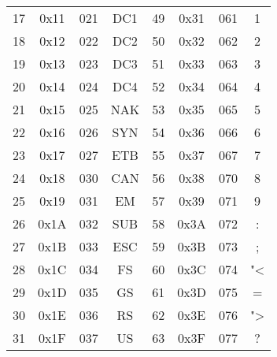 \documentclass[a4paper]{scrartcl}
\begin{document}
\begin{longtable}{|c|c|c|c||c|c|c|c|}
        17 & 0x11 & 021 & DC1 & 49 & 0x31 & 061 & 1 \\
        18 & 0x12 & 022 & DC2 & 50 & 0x32 & 062 & 2 \\
        19 & 0x13 & 023 & DC3 & 51 & 0x33 & 063 & 3 \\
        20 & 0x14 & 024 & DC4 & 52 & 0x34 & 064 & 4 \\
        21 & 0x15 & 025 & NAK & 53 & 0x35 & 065 & 5 \\
        22 & 0x16 & 026 & SYN & 54 & 0x36 & 066 & 6 \\
        23 & 0x17 & 027 & ETB & 55 & 0x37 & 067 & 7 \\
        24 & 0x18 & 030 & CAN & 56 & 0x38 & 070 & 8 \\
        25 & 0x19 & 031 & EM & 57 & 0x39 & 071 & 9 \\
        26 & 0x1A & 032 & SUB & 58 & 0x3A & 072 & : \\
        27 & 0x1B & 033 & ESC & 59 & 0x3B & 073 & ; \\
        28 & 0x1C & 034 & FS & 60 & 0x3C & 074 & "< \\
        29 & 0x1D & 035 & GS & 61 & 0x3D & 075 & =\\
        30 & 0x1E & 036 & RS & 62 & 0x3E & 076 & "> \\
        31 & 0x1F & 037 & US & 63 & 0x3F & 077 & ? \\
        \hline
        \end{longtable}
\end{document}
